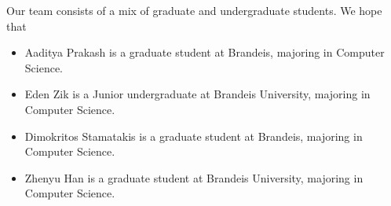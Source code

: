 Our team consists of a mix of graduate and undergraduate students. We hope that

\begin{itemize}
\item Aaditya Prakash is a graduate student at Brandeis, majoring in Computer Science.
\item Eden Zik is a Junior undergraduate at Brandeis University, majoring in Computer Science.
\item Dimokritos Stamatakis is a graduate student at Brandeis, majoring in Computer Science.
\item Zhenyu Han is a graduate student at Brandeis University, majoring in Computer Science.
\end{itemize}
